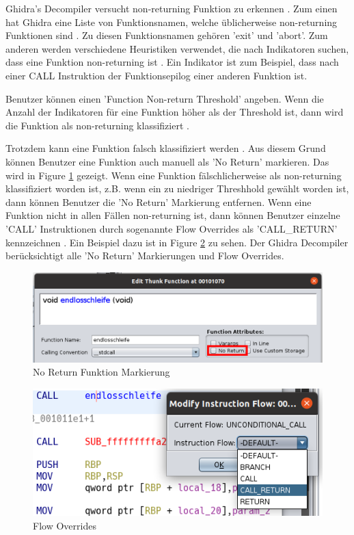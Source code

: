 Ghidra's Decompiler versucht non-returning Funktion zu erkennen \cite{15}. Zum einen hat Ghidra eine Liste von Funktionsnamen, welche üblicherweise non-returning Funktionen sind \cite{15}. Zu diesen Funktionsnamen gehören 'exit' und 'abort'. Zum anderen werden verschiedene Heuristiken verwendet, die nach Indikatoren suchen, dass eine Funktion non-returning ist \cite{15}. Ein Indikator ist zum Beispiel, dass nach einer CALL Instruktion der Funktionsepilog einer anderen Funktion ist.

Benutzer können einen 'Function Non-return Threshold' angeben. Wenn die Anzahl der Indikatoren für eine Funktion höher als der Threshold ist, dann wird die Funktion als non-returning klassifiziert \cite{21}.

Trotzdem kann eine Funktion falsch klassifiziert werden \cite{15}. Aus diesem Grund können Benutzer eine Funktion auch manuell als 'No Return' markieren. Das wird in Figure \ref{fig:noreturn} gezeigt. Wenn eine Funktion fälschlicherweise als non-returning klassifiziert worden ist, z.B. wenn ein zu niedriger Threshhold gewählt worden ist, dann können Benutzer die 'No Return' Markierung entfernen. Wenn eine Funktion nicht in allen Fällen non-returning ist, dann können Benutzer einzelne 'CALL' Instruktionen durch sogenannte Flow Overrides als 'CALL\_RETURN' kennzeichnen \cite{1}. Ein Beispiel dazu ist in Figure \ref{fig:callreturn} zu sehen. Der Ghidra Decompiler berücksichtigt alle 'No Return' Markierungen und Flow Overrides.

\begin{figure}[!h]
	\centering
	\includegraphics[width=.45\textwidth]{img/noreturnmarkierung.png}
	\caption{No Return Funktion Markierung}
	\label{fig:noreturn}
\end{figure}

\begin{figure}[!h]
	\centering
	\includegraphics[width=.45\textwidth]{img/callreturn.PNG}
	\caption{Flow Overrides}
	\label{fig:callreturn}
\end{figure}

